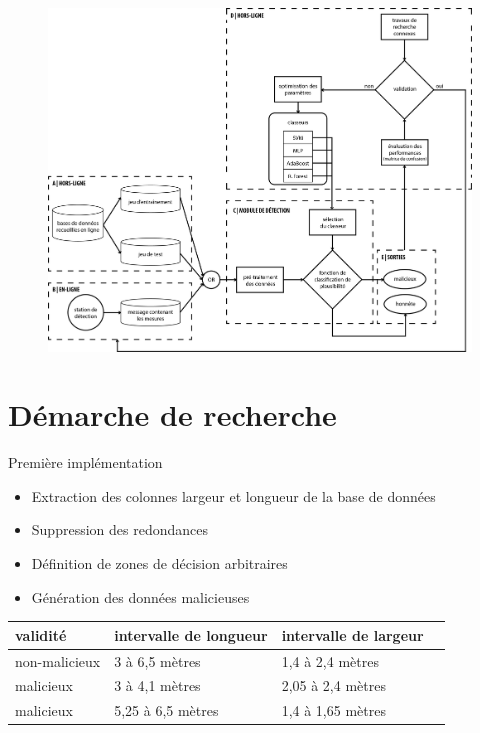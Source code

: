 \documentclass{beamer}
\begin{document}
\begin{frame}
\begin{figure}
\centering
\includegraphics[width=.9\textwidth]{img/structure.png}
\end{figure}
\end{frame}

\section{Démarche de recherche}

\begin{frame}{Première implémentation}
\begin{itemize}
\item Extraction des colonnes largeur et longueur de la base de données
\item Suppression des redondances
\item Définition de zones de décision arbitraires
\item Génération des données malicieuses
\end{itemize}
\begin{table}
\centering
\begin{tabular}{llll}
validité & intervalle de longueur & intervalle de largeur \\
\hline
non-malicieux & 3 à 6,5 mètres & 1,4 à 2,4 mètres \\
malicieux & 3 à 4,1 mètres & 2,05 à 2,4 mètres \\
malicieux & 5,25 à 6,5 mètres & 1,4 à 1,65 mètres \\
\end{tabular}
\end{table}
\end{frame}
\end{document}
